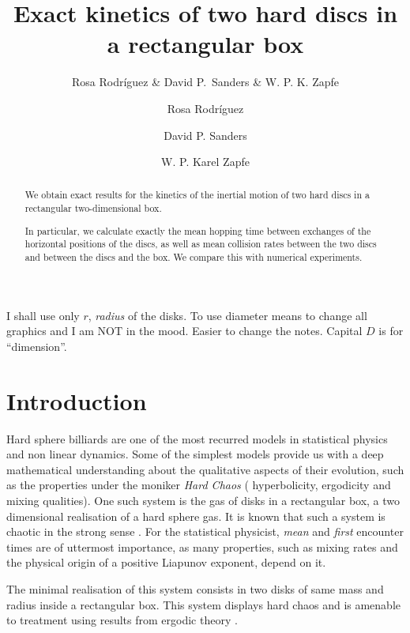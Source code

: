\documentclass[a4paper,10pt, jcp, aps, preprint]{revtex4-1}
\author{Rosa Rodríguez \& David P.~Sanders \& W. P. K. Zapfe}
\affil{Departamento de Física, Facultad de Ciencias, Universidad Nacional Autónoma de México, Ciudad Universitaria, Del.~Coyoacán, México D.F. 04510, Mexico}
\begin{document}
\title{Exact kinetics of two hard discs in a rectangular box}

\author{Rosa Rodríguez}

\author{David P. Sanders}

\author{W. P. Karel Zapfe}


\begin{abstract}
  We obtain exact results for the kinetics of the inertial motion of 
two hard discs in a rectangular two-dimensional box.

  In particular,  we calculate exactly the mean hopping time between exchanges
 of the horizontal positions of the discs, 
as well as mean collision rates between the two discs and 
 between the discs and the box. We compare this with numerical experiments.
\end{abstract}

\maketitle

I shall use only $r$, \emph{radius} of the disks. To use diameter
means to change all graphics and I am NOT in the mood. Easier to change the notes.
Capital $D$ is for ``dimension''.

\section{Introduction}

Hard sphere billiards are one of the most recurred models in
statistical physics and non linear dynamics.  Some of the simplest models
 provide us with a deep mathematical understanding
about the qualitative aspects of their evolution, such as 
the properties under the moniker \emph{Hard Chaos} (
hyperbolicity, ergodicity and mixing qualities). One such system is the
gas of disks in a rectangular box, a two dimensional realisation of a
hard sphere gas. It is known that such a system is chaotic in the
strong sense \cite{Sinai70}. 
For the statistical physicist, \emph{mean} and \emph{first} encounter
times are of uttermost importance, as many properties,
such as mixing rates and the physical origin of a positive
Liapunov exponent, depend on it. 

The minimal realisation of this
system consists in two disks of same mass and radius inside a 
rectangular box. This system displays hard chaos and 
is amenable to treatment using
results from ergodic theory \cite{Sinai70, Gallavotti74, SzaszBook00}. 
\end{document}
